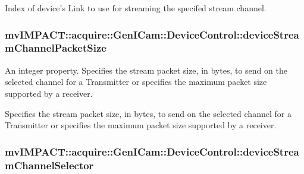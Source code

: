 Index of device's Link to use for streaming the specifed stream channel. \hypertarget{classmv_i_m_p_a_c_t_1_1acquire_1_1_gen_i_cam_1_1_device_control_a8a8350b203c1ac3603588e4185dd56d0}{
\subsubsection[{device\+Stream\+Channel\+Packet\+Size}]{ mv\+I\+M\+P\+A\+C\+T\+::acquire\+::\+Gen\+I\+Cam\+::\+Device\+Control\+::device\+Stream\+Channel\+Packet\+Size}}\label{classmv_i_m_p_a_c_t_1_1acquire_1_1_gen_i_cam_1_1_device_control_a8a8350b203c1ac3603588e4185dd56d0}


An integer property. Specifies the stream packet size, in bytes, to send on the selected channel for a Transmitter or specifies the maximum packet size supported by a receiver. 

Specifies the stream packet size, in bytes, to send on the selected channel for a Transmitter or specifies the maximum packet size supported by a receiver. \hypertarget{classmv_i_m_p_a_c_t_1_1acquire_1_1_gen_i_cam_1_1_device_control_acd2f0492412a8b7f54efdd97c6ee1925}{
\subsubsection[{device\+Stream\+Channel\+Selector}]{ mv\+I\+M\+P\+A\+C\+T\+::acquire\+::\+Gen\+I\+Cam\+::\+Device\+Control\+::device\+Stream\+Channel\+Selector}}\label{classmv_i_m_p_a_c_t_1_1acquire_1_1_gen_i_cam_1_1_device_control_acd2f0492412a8b7f54efdd97c6ee1925}


